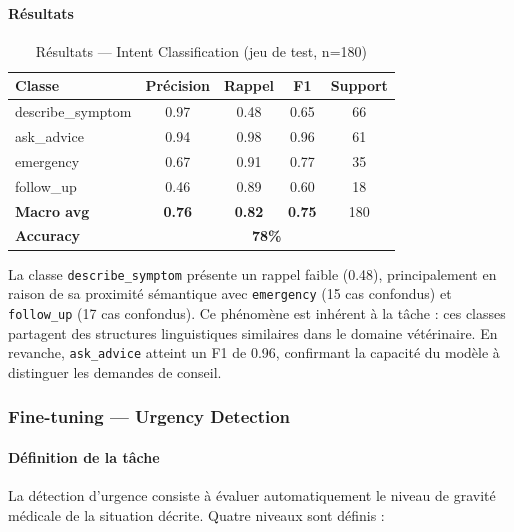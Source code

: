\paragraph{Résultats}

\begin{table}[H]
\centering
\caption{Résultats — Intent Classification (jeu de test, n=180)}
\label{tab:intent-results}
\renewcommand{\arraystretch}{1.4}
\begin{tabular}{|l|c|c|c|c|}
\hline
\textbf{Classe} & \textbf{Précision} & \textbf{Rappel} &
\textbf{F1} & \textbf{Support} \\
\hline
describe\_symptom & 0.97 & 0.48 & 0.65 & 66 \\
ask\_advice       & 0.94 & 0.98 & 0.96 & 61 \\
emergency         & 0.67 & 0.91 & 0.77 & 35 \\
follow\_up        & 0.46 & 0.89 & 0.60 & 18 \\
\hline
\textbf{Macro avg} & \textbf{0.76} & \textbf{0.82} &
\textbf{0.75} & 180 \\
\hline
\textbf{Accuracy} & \multicolumn{4}{c|}{\textbf{78\%}} \\
\hline
\end{tabular}
\end{table}

La classe \texttt{describe\_symptom} présente un rappel faible (0.48), principalement en raison de sa proximité sémantique avec \texttt{emergency} (15 cas confondus) et \texttt{follow\_up} (17 cas confondus). Ce phénomène est inhérent à la tâche : ces classes partagent des structures linguistiques similaires dans le domaine vétérinaire. En revanche, \texttt{ask\_advice} atteint un F1 de 0.96, confirmant la capacité du modèle à distinguer les demandes de conseil.

\subsubsection{Fine-tuning — Urgency Detection}

\paragraph{Définition de la tâche}

La détection d'urgence consiste à évaluer automatiquement le niveau de gravité médicale de la situation décrite. Quatre niveaux sont définis :

